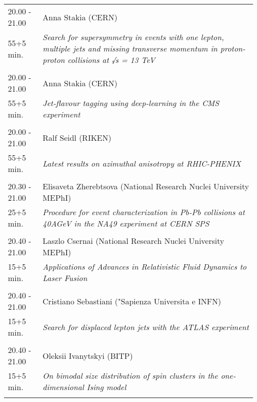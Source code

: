 \begin{longtable}{p{3cm}p{13cm}}
20.00 - 21.00 & Anna Stakia (CERN)\\ 
55+5 min. & {\it Search for supersymmetry in events with one lepton, multiple jets and missing transverse momentum in proton-proton collisions at √s = 13 TeV}\\ 
 & \\ 
20.00 - 21.00 & Anna Stakia (CERN)\\ 
55+5 min. & {\it Jet-flavour tagging using deep-learning in the CMS experiment}\\ 
 & \\ 
20.00 - 21.00 & Ralf Seidl (RIKEN)\\ 
55+5 min. & {\it Latest results on azimuthal anisotropy at RHIC-PHENIX}\\ 
 & \\ 
20.30 - 21.00 & Elisaveta Zherebtsova (National Research Nuclei University MEPhI)\\ 
25+5 min. & {\it Procedure for event characterization in Pb-Pb collisions at 40AGeV in the NA49 experiment at CERN SPS}\\ 
 & \\ 
20.40 - 21.00 & Laszlo Csernai (National Research Nuclei University MEPhI)\\ 
15+5 min. & {\it Applications of Advances in Relativistic Fluid Dynamics to Laser Fusion}\\ 
 & \\ 
20.40 - 21.00 & Cristiano Sebastiani ("Sapienza Universita e INFN)\\ 
15+5 min. & {\it Search for displaced lepton jets with the ATLAS experiment}\\ 
 & \\ 
20.40 - 21.00 & Oleksii Ivanytskyi (BITP)\\ 
15+5 min. & {\it On bimodal size distribution of spin clusters in the one-dimensional Ising model}\\ 
 & \\ 
\end{longtable}

